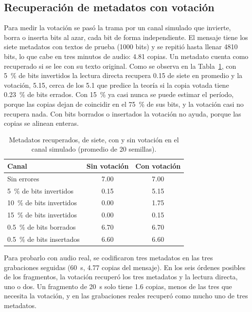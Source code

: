 \subsection{Recuperación de metadatos con votación}
Para medir la votación se pasó la trama por un canal simulado que invierte, borra o inserta bits al azar, cada bit de forma independiente. El mensaje tiene los siete metadatos con textos de prueba (1000 bits) y se repitió hasta llenar 4810 bits, lo que cabe en tres minutos de audio: 4.81 copias. Un metadato cuenta como recuperado si se lee con su texto original. Como se observa en la Tabla~\ref{tab:votacion}, con \SI{5}{\percent} de bits invertidos la lectura directa recupera 0.15 de siete en promedio y la votación, 5.15, cerca de los 5.1 que predice la teoría si la copia votada tiene \SI{0.23}{\percent} de bits errados. Con \SI{15}{\percent} ya casi nunca se puede estimar el período, porque las copias dejan de coincidir en el \SI{75}{\percent} de sus bits, y la votación casi no recupera nada. Con bits borrados o insertados la votación no ayuda, porque las copias se alinean enteras.

\begin{table}[!t]
\caption{Metadatos recuperados, de siete, con y sin votación en el canal simulado (promedio de 20 semillas).}
\label{tab:votacion}
\centering
\begin{tabular}{lcc}
\toprule
Canal & Sin votación & Con votación \\
\midrule
Sin errores & 7.00 & 7.00 \\
\SI{5}{\percent} de bits invertidos & 0.15 & 5.15 \\
\SI{10}{\percent} de bits invertidos & 0.00 & 1.75 \\
\SI{15}{\percent} de bits invertidos & 0.00 & 0.15 \\
\SI{0.5}{\percent} de bits borrados & 6.70 & 6.70 \\
\SI{0.5}{\percent} de bits insertados & 6.60 & 6.60 \\
\bottomrule
\end{tabular}
\end{table}

Para probarlo con audio real, se codificaron tres metadatos en las tres grabaciones seguidas (\SI{60}{\second}, 4.77 copias del mensaje). En los seis órdenes posibles de los fragmentos, la votación recuperó los tres metadatos y la lectura directa, uno o dos. Un fragmento de \SI{20}{\second} solo tiene 1.6 copias, menos de las tres que necesita la votación, y en las grabaciones reales recuperó como mucho uno de tres metadatos.

